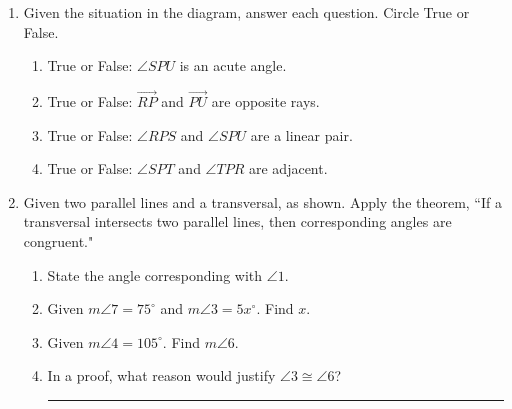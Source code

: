 \begin{enumerate}

\item Given the situation in the diagram, answer each question. Circle True or False. %
  \begin{flushleft}
\end{flushleft}
\begin{enumerate}
  \item True or False: $\angle SPU$ is an acute angle.
  \item True or False: $\overrightarrow{RP}$ and $\overrightarrow{PU}$ are opposite rays.
  \item True or False: $\angle RPS$ and $\angle SPU$ are a linear pair.
  \item True or False: $\angle SPT$ and $\angle TPR$ are adjacent.
\end{enumerate}

\item Given two parallel lines and a transversal, as shown. Apply the theorem, ``If a transversal intersects two parallel lines, then corresponding angles are congruent."
\begin{center}
\end{center}
\begin{enumerate}
  \item State the angle corresponding with $\angle 1$. \bigskip
  \item Given $m\angle 7 = 75^\circ$ and $m\angle 3 = 5x^\circ$. Find $x$. \bigskip
  \item Given $m\angle 4 = 105^\circ$. Find $m\angle 6$. \bigskip
  \item In a proof, what reason would justify $\angle 3 \cong \angle 6$? \rule{6cm}{0.15mm}
\end{enumerate}


\end{enumerate}
